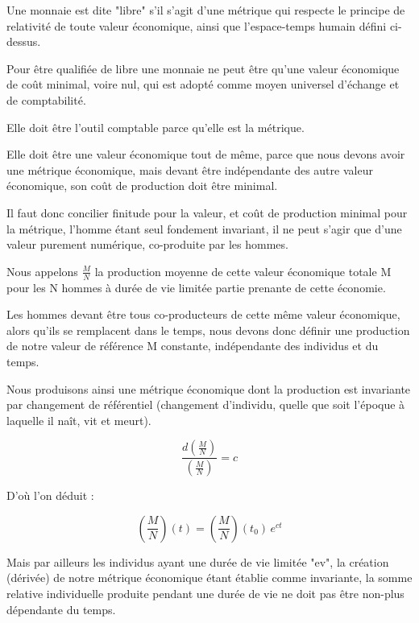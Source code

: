 \documentclass[a4paper,oneside,12pt]{article}
\begin{document}
Une monnaie est dite "libre" s'il s'agit d'une métrique qui respecte le principe de relativité de toute valeur économique, ainsi que l'espace-temps humain défini ci-dessus.

Pour être qualifiée de libre une monnaie ne peut être qu'une valeur économique de coût minimal, voire nul, qui est adopté comme moyen universel d'échange et de comptabilité.

Elle doit être l'outil comptable parce qu'elle est la métrique.

Elle doit être une valeur économique tout de même, parce que nous devons avoir une métrique économique, mais devant être indépendante des autre valeur économique, son coût de production doit être minimal.

Il faut donc concilier finitude pour la valeur, et coût de production minimal pour la métrique, l'homme étant seul fondement invariant, il ne peut s'agir que d'une valeur purement numérique, co-produite par les hommes.

Nous appelons $\frac{M}{N}$ la production moyenne de cette valeur économique totale M pour les N hommes à durée de vie limitée partie prenante de cette économie.

Les hommes devant être tous co-producteurs de cette même valeur économique, alors qu'ils se remplacent dans le temps, nous devons donc définir une production de notre valeur de référence M constante, indépendante des individus et du temps.

Nous produisons ainsi une métrique économique dont la production est invariante par changement de référentiel (changement d'individu, quelle que soit l'époque à laquelle il naît, vit et meurt).

\begin{center}
\begin{displaymath}\frac{d \left( \frac{M}{N} \right) }{\left( \frac{M}{N} \right)}=c \end{displaymath}
\end{center}

D'où l'on déduit :

\begin{center}
\begin{displaymath}\left( \frac{M}{N} \right) (t)=\left( \frac{M}{N} \right) (t_{0}) \, e^{ct} \end{displaymath}
\end{center}

Mais par ailleurs les individus ayant une durée de vie limitée "ev", la création (dérivée) de notre métrique économique étant établie comme invariante, la somme relative individuelle produite pendant une durée de vie ne doit pas être non-plus dépendante du temps.
\end{document}
